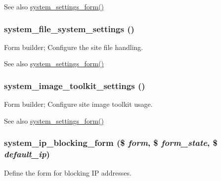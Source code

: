 \begin{DoxySeeAlso}{See also}
\hyperlink{group__forms_ga6fb270d34465d846cd4659a85d3e40c8}{system\_\-settings\_\-form()} 
\end{DoxySeeAlso}
\hypertarget{group__forms_gab0199bde08bcb49ff536dd4987718632}{
\subsubsection[{system\_\-file\_\-system\_\-settings}]{\setlength{\rightskip}{0pt plus 5cm}system\_\-file\_\-system\_\-settings ()}}
\label{group__forms_gab0199bde08bcb49ff536dd4987718632}
Form builder; Configure the site file handling.

\begin{DoxySeeAlso}{See also}
\hyperlink{group__forms_ga6fb270d34465d846cd4659a85d3e40c8}{system\_\-settings\_\-form()} 
\end{DoxySeeAlso}
\hypertarget{group__forms_gaefe85833f426aa428f4ac75d641d7631}{
\subsubsection[{system\_\-image\_\-toolkit\_\-settings}]{\setlength{\rightskip}{0pt plus 5cm}system\_\-image\_\-toolkit\_\-settings ()}}
\label{group__forms_gaefe85833f426aa428f4ac75d641d7631}
Form builder; Configure site image toolkit usage.

\begin{DoxySeeAlso}{See also}
\hyperlink{group__forms_ga6fb270d34465d846cd4659a85d3e40c8}{system\_\-settings\_\-form()} 
\end{DoxySeeAlso}
\hypertarget{group__forms_gac3f2a53aa9b70f6366568d557701d163}{
\subsubsection[{system\_\-ip\_\-blocking\_\-form}]{\setlength{\rightskip}{0pt plus 5cm}system\_\-ip\_\-blocking\_\-form (\$ {\em form}, \/  \$ {\em form\_\-state}, \/  \$ {\em default\_\-ip})}}
\label{group__forms_gac3f2a53aa9b70f6366568d557701d163}
Define the form for blocking IP addresses.

